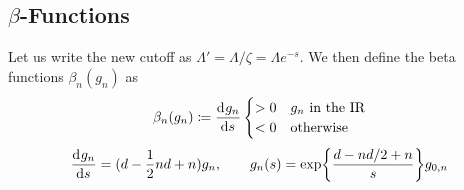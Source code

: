 \subsection{\texorpdfstring{$\beta$}{Beta}-Functions}%
\label{sub:beta_functions}

Let us write the new cutoff as $\Lambda' = \Lambda/\zeta = \Lambda e^{-s}$.
We then define the beta functions $\beta_n(g_n)$ as 
\begin{equation}
  \beta_n(g_n) \coloneqq \dv[]{g_n}{s} 
  \begin{cases}
    > 0 & \text{$g_n$ in the IR}\\
    < 0 & \text{otherwise}
  \end{cases}
\end{equation}
\begin{equation}
  \dv[]{g_n}{s} = (d - \frac{1}{2} n d + n ) g_n, \qquad g_n(s) = \exp{\frac{d - nd/2 + n}{s}} g_{0, n}
\end{equation}
